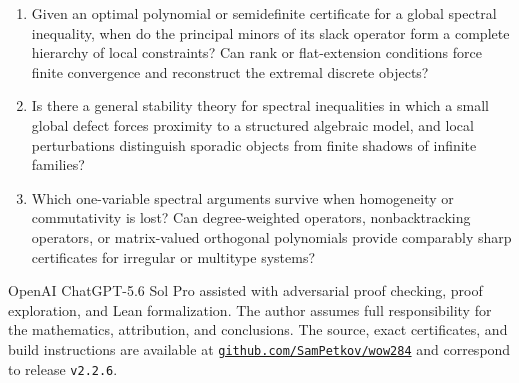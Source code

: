 \documentclass[a4paper,10pt,reqno]{amsart}
\theoremstyle{plain}
\theoremstyle{definition}
\theoremstyle{remark}
\newcommand{\RepoTag}{v2.2.6}
\begin{document}
\begin{enumerate}
\item Given an optimal polynomial or semidefinite certificate for a global
spectral inequality, when do the principal minors of its slack operator form a
complete hierarchy of local constraints?  Can rank or flat-extension
conditions force finite convergence and reconstruct the extremal discrete
objects?
\item Is there a general stability theory for spectral inequalities in which a
small global defect forces proximity to a structured algebraic model, and
local perturbations distinguish sporadic objects from finite shadows of
infinite families?
\item Which one-variable spectral arguments survive when homogeneity or
commutativity is lost?  Can degree-weighted operators, nonbacktracking
operators, or matrix-valued orthogonal polynomials provide comparably sharp
certificates for irregular or multitype systems?
\end{enumerate}

OpenAI ChatGPT-5.6 Sol Pro assisted with adversarial proof checking, proof
exploration, and Lean formalization.  The author assumes full responsibility
for the mathematics, attribution, and conclusions.  The source, exact
certificates, and build instructions are available at
\href{https://github.com/SamPetkov/wow284}{\texttt{github.com/SamPetkov/wow284}}
and correspond to release \texttt{\RepoTag}.

\clearpage
\begingroup
\footnotesize
\setlength{\bibsep}{0pt}
\renewcommand{\bibsection}{\section*{References}}


\endgroup
\end{document}
